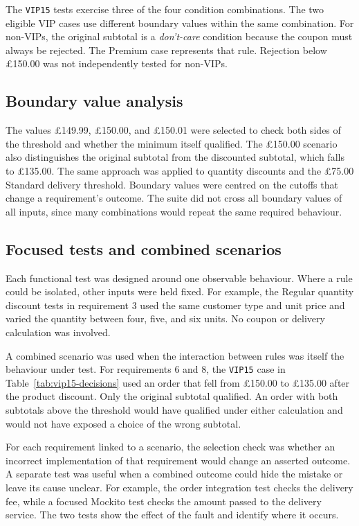 The \texttt{VIP15} tests exercise three of the four condition
combinations. The two eligible VIP cases use different boundary values
within the same combination. For non-VIPs, the original subtotal is a
\emph{don't-care} condition because the coupon must always be rejected.
The Premium case represents that rule. Rejection below \pounds150.00
was not independently tested for non-VIPs.

\subsection{Boundary value analysis}
The values \pounds149.99, \pounds150.00, and \pounds150.01 were selected
to check both sides of the threshold and whether the minimum itself
qualified. The \pounds150.00 scenario also distinguishes the original
subtotal from the discounted subtotal, which falls to \pounds135.00.
The same approach was applied to quantity discounts and the
\pounds75.00 Standard delivery threshold. Boundary values were centred
on the cutoffs that change a requirement's outcome. The suite did not
cross all boundary values of all inputs, since many combinations would
repeat the same required behaviour.

\subsection{Focused tests and combined scenarios}
Each functional test was designed around one observable behaviour.
Where a rule could be isolated, other inputs were held fixed. For
example, the Regular quantity discount tests in requirement 3 used the
same customer type and unit price and varied the quantity between four,
five, and six units. No coupon or delivery calculation was involved.

A combined scenario was used when the interaction between rules was
itself the behaviour under test. For requirements 6 and 8, the
\texttt{VIP15} case in Table~\ref{tab:vip15-decisions} used an order that
fell from \pounds150.00 to \pounds135.00 after the product discount.
Only the original subtotal qualified. An order with both subtotals
above the threshold would have qualified under either calculation and
would not have exposed a choice of the wrong subtotal.

For each requirement linked to a scenario, the selection check was
whether an incorrect implementation of that requirement would change
an asserted outcome. A separate test was useful when a combined outcome
could hide the mistake or leave its cause unclear. For example, the
order integration test checks the delivery fee, while a focused Mockito
test checks the amount passed to the delivery service. The two tests
show the effect of the fault and identify where it occurs.

